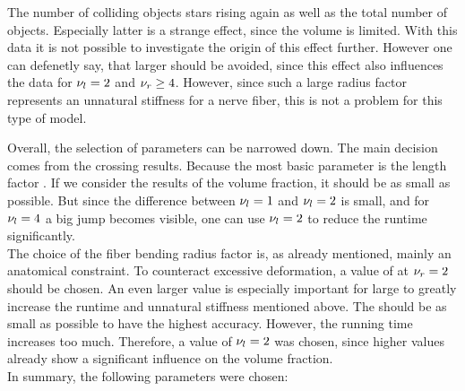 The number of colliding objects stars rising again as well as the total number of objects.
Especially latter is a strange effect, since the volume is limited.
With this data it is not possible to investigate the origin of this effect further.
However one can defenetly say, that larger \segRadiusFactor{} should be avoided, since this effect also influences the data for $\textnormal{$\nu_{l}$} = 2$ and $\textnormal{$\nu_{r}$} \geq 4$.
However, since such a large radius factor represents an unnatural stiffness for a nerve fiber, this is not a problem for this type of model.
\par
% 
Overall, the selection of parameters can be narrowed down.
The main decision comes from the crossing results.
Because the most basic parameter is the length factor \segLengthFactor{}.
If we consider the results of the volume fraction, it should be as small as possible.
But since the difference between $\textnormal{$\nu_{l}$}=\SI{1}{}$ and $\textnormal{$\nu_{l}$}=\SI{2}{}$ is small, and for $\textnormal{$\nu_{l}$}=\SI{4}{}$ a big jump becomes visible, one can use $\textnormal{$\nu_{l}$}=\SI{2}{}$ to reduce the runtime significantly.
\\
% 
The choice of the fiber bending radius factor \segRadiusFactor{} is, as already mentioned, mainly an anatomical constraint.
To counteract excessive deformation, a value of at $\textnormal{$\nu_{r}$} = \SI{2}{}$ should be chosen.
An even larger value is especially important for large \segLengthFactor{} to greatly increase the runtime and unnatural stiffness mentioned above.
The \segLengthFactor{} should be as small as possible to have the highest accuracy.
However, the running time increases too much.
Therefore, a value of $\textnormal{$\nu_{l}$} = \SI{2}{}$ was chosen, since higher values already show a significant influence on the volume fraction.
\\
% 
In summary, the following parameters were chosen:
% 
\begin{table}[H]
%
\centering
\end{table}
